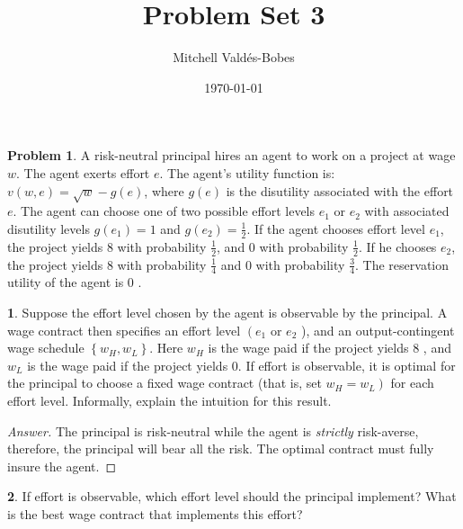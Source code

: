 \documentclass[12pt]{article}
\title{Problem Set 3}
\author{Mitchell Valdés-Bobes}
\date{\today}
\theoremstyle{definition}
\newtheorem{problem}{Problem}
\newtheorem{subproblem}{}[problem]
\begin{document}
\maketitle
\begin{problem}
A risk-neutral principal hires an agent to work on a project at wage $w$. The agent exerts effort $e$. The agent's utility function is: $v(w, e)=\sqrt{w}-g(e)$, where $g(e)$ is the disutility associated with the effort $e$. The agent can choose one of two possible effort levels $e_{1}$ or $e_{2}$ with associated disutility levels $g\left(e_{1}\right)=1$ and $g\left(e_{2}\right)=\frac{1}{2}$. If the agent chooses effort level $e_{1}$, the project yields 8 with probability $\frac{1}{2}$, and 0 with probability $\frac{1}{2}$. If he chooses $e_{2}$, the project yields 8 with probability $\frac{1}{4}$ and 0 with probability $\frac{3}{4}$. The reservation utility of the agent is 0 .
\end{problem}
\begin{subproblem}
Suppose the effort level chosen by the agent is observable by the principal. A wage contract then specifies an effort level $\left(e_{1}\right.$ or $e_{2}$ ), and an output-contingent wage schedule $\left\{w_{H}, w_{L}\right\}$. Here $w_{H}$ is the wage paid if the project yields 8 , and $w_{L}$ is the wage paid if the project yields $0 .$ If effort is observable, it is optimal for the principal to choose a fixed wage contract (that is, set $\left.w_{H}=w_{L}\right)$ for each effort level. Informally, explain the intuition for this result.
\end{subproblem}
\begin{proof}[Answer]
The principal is risk-neutral while the agent is \textit{strictly} risk-averse, therefore, the principal will bear all the risk. The optimal contract must fully insure the agent.
\end{proof}
\begin{subproblem}
If effort is observable, which effort level should the principal implement? What is the best wage contract that implements this effort?
\end{subproblem}
\end{document}
